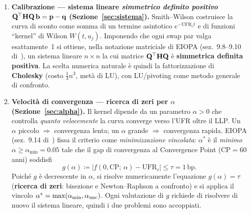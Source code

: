 \documentclass[11pt,a4paper]{article}
\theoremstyle{plain}
\theoremstyle{definition}
\theoremstyle{remark}
\newcommand{\UFR}{\ensuremath{\mathrm{UFR}}}
\newcommand{\CP}{\ensuremath{\mathrm{CP}}}
\newcommand{\bfb}{\mathbf{b}}
\newcommand{\bfp}{\mathbf{p}}
\newcommand{\bfq}{\mathbf{q}}
\newcommand{\Hmat}{\mathbf{H}}
\newcommand{\Qmat}{\mathbf{Q}}
\newcommand{\transp}{^{\mskip-1mu\top}}
\newcommand{\abs}[1]{\left\lvert #1 \right\rvert}
\newcommand{\defeq}{\coloneqq}
\begin{document}
\begin{enumerate}
  \item \textbf{Calibrazione --- sistema lineare \emph{simmetrico definito positivo}
        $\Qmat\transp\Hmat\Qmat\,\bfb = \bfp - \bfq$ (Sezione~\ref{sec:sistema}).}
        Smith--Wilson costruisce la curva di sconto come somma di un termine
        asintotico $e^{-\UFR_c t}$ e di funzioni ``kernel'' di Wilson $W(t, u_j)$.
        Imponendo che ogni swap par valga esattamente~1 si ottiene, nella notazione
        matriciale di EIOPA (sez.~9.8--9.10 di~\cite{eiopa2025}), un sistema lineare
        $n\times n$ la cui matrice $\Qmat\transp\Hmat\Qmat$ è \textbf{simmetrica
        definita positiva}. La scelta numerica naturale è quindi la fattorizzazione
        di \textbf{Cholesky} (costo $\tfrac13 n^3$, metà di LU), con LU/pivoting come
        metodo generale di confronto.

  \item \textbf{Velocità di convergenza --- ricerca di zeri per $\alpha$
        (Sezione~\ref{sec:alpha}).}
        Il kernel dipende da un parametro $\alpha > 0$ che controlla
        \emph{quanto velocemente} la curva converge verso l'UFR oltre il LLP.
        Un $\alpha$ piccolo $\Rightarrow$ convergenza lenta; un $\alpha$ grande
        $\Rightarrow$ convergenza rapida. EIOPA (sez.~9.14 di~\cite{eiopa2025})
        fissa il criterio come \emph{minimizzazione vincolata}: $\alpha^*$ è il
        \emph{minimo} $\alpha \ge \alpha_{\min}=0.05$ tale che il gap di convergenza
        al Convergence Point ($\CP = 60$ anni) soddisfi
        \[
          g(\alpha) \defeq \abs{f(0, \CP;\, \alpha) - \UFR_c} \le \tau = 1\,\text{bp}.
        \]
        Poiché $g$ è decrescente in $\alpha$, si risolve numericamente l'equazione
        $g(\alpha)=\tau$ (\textbf{ricerca di zeri}: bisezione e Newton--Raphson a
        confronto) e si applica il vincolo $\alpha^*=\max(\alpha_{\min},\alpha_{\rm unc})$.
        Ogni valutazione di $g$ richiede di risolvere di nuovo il sistema lineare,
        quindi i due problemi sono accoppiati.
\end{enumerate}
\end{document}

